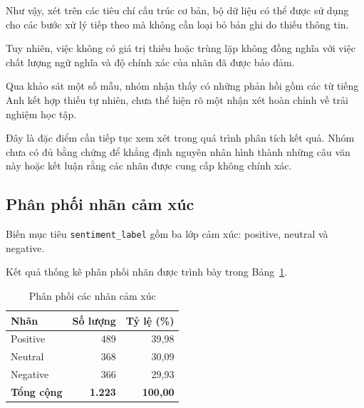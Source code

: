 Như vậy, xét trên các tiêu chí cấu trúc cơ bản, bộ dữ liệu có thể được sử dụng cho các bước xử lý tiếp theo mà không cần loại bỏ bản ghi do thiếu thông tin.

Tuy nhiên, việc không có giá trị thiếu hoặc trùng lặp không đồng nghĩa với việc chất lượng ngữ nghĩa và độ chính xác của nhãn đã được bảo đảm.

Qua khảo sát một số mẫu, nhóm nhận thấy có những phản hồi gồm các từ tiếng Anh kết hợp thiếu tự nhiên, chưa thể hiện rõ một nhận xét hoàn chỉnh về trải nghiệm học tập.

Đây là đặc điểm cần tiếp tục xem xét trong quá trình phân tích kết quả. Nhóm chưa có đủ bằng chứng để khẳng định nguyên nhân hình thành những câu văn này hoặc kết luận rằng các nhãn được cung cấp không chính xác.



\subsection{Phân phối nhãn cảm xúc}

Biến mục tiêu \texttt{sentiment\_label} gồm ba lớp cảm xúc: positive, neutral và negative.

Kết quả thống kê phân phối nhãn được trình bày trong Bảng~\ref{tab:phan-phoi-nhan}.

\begin{table}[H]
    \centering
    \caption{Phân phối các nhãn cảm xúc}
    \label{tab:phan-phoi-nhan}
    \renewcommand{\arraystretch}{1.15}

    \begin{tabular}{|l|r|r|}
        \hline
        \textbf{Nhãn}
        & \textbf{Số lượng}
        & \textbf{Tỷ lệ (\%)} \\
        \hline

        Positive & 489 & 39,98 \\
        \hline

        Neutral & 368 & 30,09 \\
        \hline

        Negative & 366 & 29,93 \\
        \hline

        \textbf{Tổng cộng}
        & \textbf{1.223}
        & \textbf{100,00} \\
        \hline
    \end{tabular}
\end{table}

